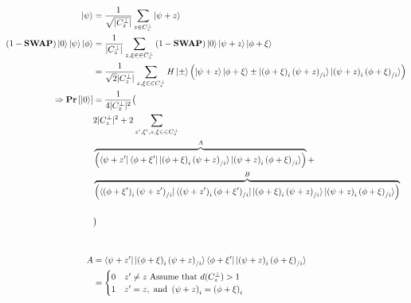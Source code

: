 \documentclass[manuscript,screen,review]{acmart}
\begin{document}
\begin{equation*}
  \begin{split}
    \ket{\psi} & = \frac{1}{\sqrt{|C_{z}^{\perp}|}}\sum_{z \in C_{z}^{\perp}}{ \ket{\psi + z   }} \\ 
    (1-\mathbf{SWAP})\ket{0}\ket{\psi}\ket{\phi} &= \frac{1}{|C_{z}^{\perp}|}\sum_{z,\xi \in  \in C_{z}^{\perp} }{(1-\mathbf{SWAP})\ket{0} \ket{\psi + z   }\ket{\phi + \xi   }}\\
    & = \frac{1}{\sqrt{2}|C_{z}^{\perp}|}\sum_{z,\xi \in  \in C_{z}^{\perp} }{  H\ket{\pm} \left( \ket{\psi + z   }\ket{\phi + \xi   }  \pm  \ket{  \left( \phi + \xi \right)_{ i }\left( \psi + z \right)_{ / i }   }\ket{\left( \psi + z \right)_{ i }\left( \phi + \xi \right)_{ / i }  }  \right) }\\
    \Rightarrow \mathbf{Pr} \left[  \ket{0}  \right] &=  \frac{1}{4|C_{z}^{\perp}|^{2}} \big( \\ 
      & 2 |C_{z}^{\perp}|^{2} + 2 \sum_{z^{\prime},\xi^{\prime},  z,\xi \in  \in C_{z}^{\perp} }   \\
    & \overbrace{ \left(    \bra{\psi + z^{\prime}   }\bra{\phi + \xi^{\prime}   } \ket{  \left( \phi + \xi \right)_{ i }\left( \psi + z \right)_{ / i }   }\ket{\left( \psi + z \right)_{ i }\left( \phi + \xi \right)_{ / i }  }  \right)}^{A} +\\
  &  \overbrace{\left(   \bra{  \left( \phi + \xi^{\prime} \right)_{ i }\left( \psi + z^{\prime} \right)_{ / i }   }\bra{\left( \psi + z^{\prime} \right)_{ i }\left( \phi + \xi^{\prime} \right)_{ / i }  }  \ket{  \left( \phi + \xi \right)_{ i }\left( \psi + z \right)_{ / i }   }\ket{\left( \psi + z \right)_{ i }\left( \phi + \xi \right)_{ / i }  }  \right) }^{B}\\ 
& \\ & \big) \\ & \\ & \\  
    A &=     \bra{\psi + z^{\prime}   }\ket{  \left( \phi + \xi \right)_{ i }\left( \psi + z \right)_{ / i }   } \bra{\phi + \xi^{\prime}   } \ket{\left( \psi + z \right)_{ i }\left( \phi + \xi \right)_{ / i }  }  \\
    & = \begin{cases}
    0 & z^{\prime}\neq z \text{ Assume that } d( C_{z}^{\perp} ) > 1    \\
    1 &  z^{\prime} = z, \text{ and } \left( \psi + z \right)_{i} = \left( \phi + \xi  \right)_{i}  
    \end{cases}
  \end{split}
\end{equation*}
\end{document}
